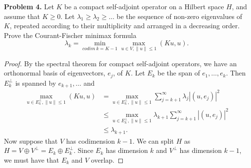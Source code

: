 \documentclass[11pt,letterpaper]{report}
\begin{document}
\noindent\textbf{Problem 4. }Let $K$ be a compact self-adjoint operator on a Hilbert space $H$, and assume that $K\geq 0$. Let $\lambda_1 \geq \lambda_2\geq \ldots$ be the sequence of non-zero eigenvalues of $K$, repeated according to their multiplicity and arranged in a decreasing order. Prove the Courant-Fischer minimax formula
\[
\lambda_k = \min_{codim\ k = K-1}\max_{u\in V, \|u\|\leq 1}(Ku, u).
\]
\begin{proof}
	By the spectral theorem for compact self-adjoint operators, we have an orthonormal basis of eigenvectors, $e_j$, of $K$. Let $E_k$ be the span of $e_1, \ldots, e_k$. Then $E_k^\perp$ is spanned by $e_{k+1}, \ldots$ and
	\begin{align*}
	\max_{u\in E_k^\perp, \|u\|\leq 1}(Ku,u) &= \max_{u\in E_k^\perp, \|u\|\leq 1}\sum_{j=k+1}^\infty \lambda_j|(u, e_j)|^2\\
	&\leq\max_{u\in E_k^\perp, \|u\|\leq 1} \lambda_{k+1}\sum_{j = k+1}^\infty |(u, e_j)|^2\\
	&\leq \lambda_{k+1}.
	\end{align*}
	Now suppose that $V$ has codimension $k-1$. We can split $H$ as $H = V\oplus V^\perp = E_k\oplus E_k^\perp$. Since $E_k$ has dimension $k$ and $V^\perp$ has dimension $k-1$, we must have that $E_k$ and $V$ overlap. 
\end{proof}
\end{document}
